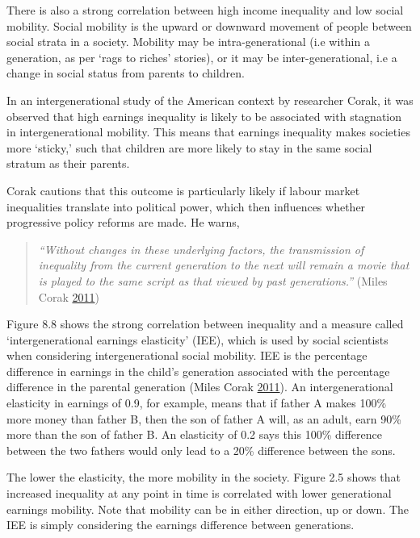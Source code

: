 \documentclass[]{tufte-handout}
\begin{document}
There is also a strong correlation between high income inequality and
low social mobility. Social mobility is the upward or downward movement
of people between social strata in a society. Mobility may be
intra-generational (i.e within a generation, as per `rags to riches'
stories), or it may be inter-generational, i.e a change in social status
from parents to children.

In an intergenerational study of the American context by researcher
Corak, it was observed that high earnings inequality is likely to be
associated with stagnation in intergenerational mobility. This means
that earnings inequality makes societies more `sticky,' such that
children are more likely to stay in the same social stratum as their
parents.

Corak cautions that this outcome is particularly likely if labour market
inequalities translate into political power, which then influences
whether progressive policy reforms are made. He warns,

\begin{quote}
\emph{``Without changes in these underlying factors, the transmission of
inequality from the current generation to the next will remain a movie
that is played to the same script as that viewed by past generations.''
} (Miles Corak \protect\hyperlink{ref-MilesCorak2011}{2011})
\end{quote}

Figure 8.8 shows the strong correlation between inequality and a measure
called `intergenerational earnings elasticity' (IEE), which is used by
social scientists when considering intergenerational social mobility.
IEE is the percentage difference in earnings in the child's generation
associated with the percentage difference in the parental generation
(Miles Corak \protect\hyperlink{ref-MilesCorak2011}{2011}). An
intergenerational elasticity in earnings of 0.9, for example, means that
if father A makes 100\% more money than father B, then the son of father
A will, as an adult, earn 90\% more than the son of father B. An
elasticity of 0.2 says this 100\% difference between the two fathers
would only lead to a 20\% difference between the sons.

The lower the elasticity, the more mobility in the society. Figure 2.5
shows that increased inequality at any point in time is correlated with
lower generational earnings mobility. Note that mobility can be in
either direction, up or down. The IEE is simply considering the earnings
difference between generations.
\end{document}
